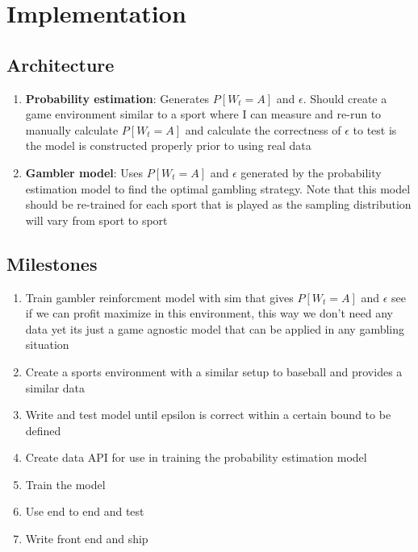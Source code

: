 \documentclass{article}
\begin{document}
    
\section*{Implementation}
    \subsection*{Architecture}

        \begin{enumerate}
            \item \textbf{Probability estimation}: Generates $P[W_t = A]$ and $\epsilon$. Should create a game environment similar to a sport where I can measure and re-run to manually calculate $P[W_t = A]$ and calculate the correctness of $\epsilon$ to test is the model is constructed properly prior to using real data
            \item \textbf{Gambler model}: Uses $P[W_t = A]$ and $\epsilon$ generated by the probability estimation model to find the optimal gambling strategy. Note that this model should be re-trained for each sport that is played as the sampling distribution will vary from sport to sport
        \end{enumerate}
    
    \subsection*{Milestones}
    
        \begin{enumerate}
            \item Train gambler reinforcment model with sim that gives $P[W_t = A]$ and $\epsilon$ see if we can profit maximize in this environment, this way we don't need any data yet its just a game agnostic model that can be applied in any gambling situation
            \item Create a sports environment with a similar setup to baseball and provides a similar data
            \item Write and test model until epsilon is correct within a certain bound to be defined
            \item Create data API for use in training the probability estimation model
            \item Train the model
            \item Use end to end and test
            \item Write front end and ship
        \end{enumerate}
\end{document}
